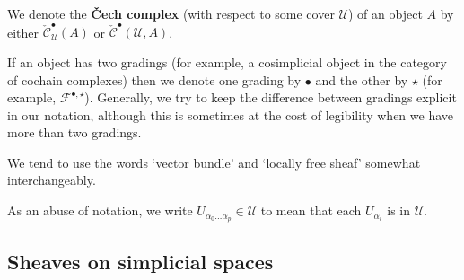 \documentclass[11pt,fleqn]{article}
\theoremstyle{plain}
\theoremstyle{definition}
\theoremstyle{remark}
\numberwithin{equation}{theorem}
\newcommand{\cover}{\mathcal{U}}
\newcommand{\anotherbullet}{\star}
\newcommand{\cech}{\check{\mathscr{C}}}
\newcommand{\define}[1]{\textbf{#1}}
\begin{document}
        \medskip

        We denote the \define{Čech complex} (with respect to some cover $\cover$) of an object $A$ by either $\cech_\cover^\bullet(A)$ or $\cech^\bullet(\cover,A)$.

        \medskip

        If an object has two gradings (for example, a cosimplicial object in the category of cochain complexes) then we denote one grading by $\bullet$ and the other by $\anotherbullet$ (for example, $\mathscr{F}^{\bullet,\anotherbullet}$).
        Generally, we try to keep the difference between gradings explicit in our notation, although this is sometimes at the cost of legibility when we have more than two gradings.

        \medskip

        We tend to use the words `vector bundle' and `locally free sheaf' somewhat interchangeably.

        \medskip

        As an abuse of notation, we write $U_{\alpha_0\ldots\alpha_p}\in\cover$ to mean that each $U_{\alpha_i}$ is in $\cover$.


    \subsection{Sheaves on simplicial spaces}
\end{document}
